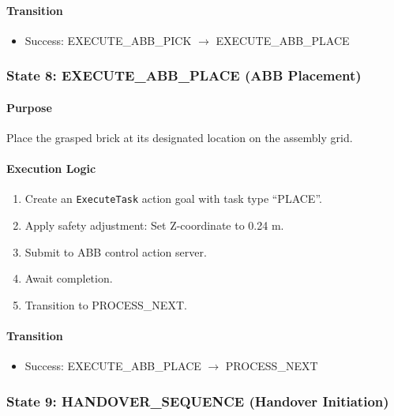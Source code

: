 \paragraph{Transition}

\begin{itemize}
    \item Success: EXECUTE\_ABB\_PICK $\rightarrow$ EXECUTE\_ABB\_PLACE
\end{itemize}

\subsubsection{State 8: EXECUTE\_ABB\_PLACE (ABB Placement)}
\label{state:executeABBplace}

\paragraph{Purpose}

Place the grasped brick at its designated location on the assembly grid.

\paragraph{Execution Logic}

\begin{enumerate}
    \item Create an \texttt{ExecuteTask} action goal with task type ``PLACE''.
    \item Apply safety adjustment: Set Z-coordinate to 0.24 m.
    \item Submit to ABB control action server.
    \item Await completion.
    \item Transition to PROCESS\_NEXT.
\end{enumerate}

\paragraph{Transition}

\begin{itemize}
    \item Success: EXECUTE\_ABB\_PLACE $\rightarrow$ PROCESS\_NEXT
\end{itemize}

\subsubsection{State 9: HANDOVER\_SEQUENCE (Handover Initiation)}
\label{state:handoversequence}

